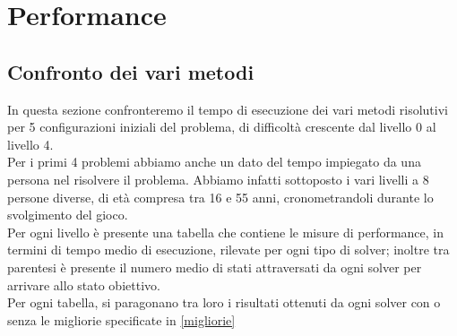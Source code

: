 
\chapter{Performance}
\label{cap:performance}
\section{Confronto dei vari metodi}
In questa sezione confronteremo il tempo di esecuzione dei vari metodi risolutivi per 5 configurazioni iniziali del problema, di difficoltà crescente dal livello 0 al livello 4.\\
Per i primi 4 problemi abbiamo anche un dato del tempo impiegato da una persona nel risolvere il problema. Abbiamo infatti sottoposto i vari livelli a 8 persone diverse, di età compresa tra 16 e 55 anni, cronometrandoli durante lo svolgimento del gioco.\\
Per ogni livello è presente una tabella che contiene le misure di performance, in termini di tempo medio di esecuzione, rilevate per ogni tipo di solver; inoltre tra parentesi è presente il numero medio di stati attraversati da ogni solver per arrivare allo stato obiettivo. \\
Per ogni tabella, si paragonano tra loro i risultati ottenuti da ogni solver con o senza le migliorie specificate in \ref{migliorie}

